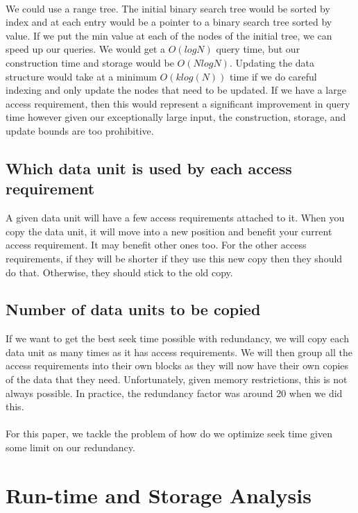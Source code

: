 \documentclass[11pt,psfig]{article}
\begin{document}
\\
We could use a range tree. The initial binary search tree would be sorted by index and at each entry would be a pointer to a binary search tree sorted by value. If we put the min value at each of the nodes of the initial tree, we can speed up our queries. We would get a $O(log N)$ query time, but our construction time and storage would be $O(N log N)$. Updating the data structure would take at a minimum $O(k log(N))$ time if we do careful indexing and only update the nodes that need to be updated. If we have a large access requirement, then this would represent a significant improvement in query time however given our exceptionally large input, the construction, storage, and update bounds are too prohibitive.  

\subsection*{Which data unit is used by each access requirement}

A given data unit will have a few access requirements attached to it. When you copy the data unit, it will move into a new position and benefit your current access requirement. It may benefit other ones too. For the other access requirements, if they will be shorter if they use this new copy then they should do that. Otherwise, they should stick to the old copy. 

\subsection*{Number of data units to be copied} 

If we want to get the best seek time possible with redundancy, we will copy each data unit as many times as it has access requirements. We will then group all the access requirements into their own blocks as they will now have their own copies of the data that they need. Unfortunately, given memory restrictions, this is not always possible. In practice, the redundancy factor was around 20 when we did this. \\
\\
For this paper, we tackle the problem of how do we optimize seek time given some limit on our redundancy. 

\section*{Run-time and Storage Analysis}
\end{document}
